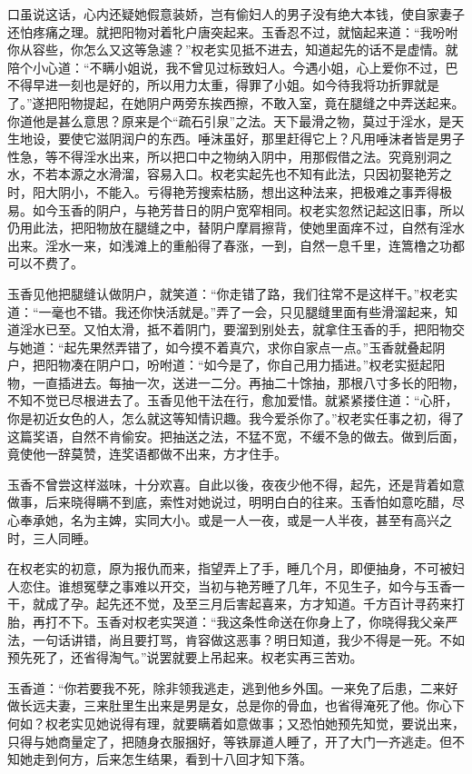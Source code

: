 \documentclass[a4paper,12pt,UTF8,twoside]{ctexbook}
\begin{document}
口虽说这话，心内还疑她假意装娇，岂有偷妇人的男子没有绝大本钱，使自家妻子还怕疼痛之理。就把阳物对着牝户唐突起来。玉香忍不过，就恼起来道：“我吩咐你从容些，你怎么又这等急遽？”权老实见抵不进去，知道起先的话不是虚情。就陪个小心道：“不瞒小姐说，我不曾见过标致妇人。今遇小姐，心上爱你不过，巴不得早进一刻也是好的，所以用力太重，得罪了小姐。如今待我将功折罪就是了。”遂把阳物提起，在她阴户两旁东挨西擦，不敢入室，竟在腿缝之中弄送起来。你道他是甚么意思？原来是个“疏石引泉”之法。天下最滑之物，莫过于淫水，是天生地设，要使它滋阴润户的东西。唾沫虽好，那里赶得它上？凡用唾沫者皆是男子性急，等不得淫水出来，所以把口中之物纳入阴中，用那假借之法。究竟别洞之水，不若本源之水滑溜，容易入口。权老实起先也不知有此法，只因初娶艳芳之时，阳大阴小，不能入。亏得艳芳搜索枯肠，想出这种法来，把极难之事弄得极易。如今玉香的阴户，与艳芳昔日的阴户宽窄相同。权老实忽然记起这旧事，所以仍用此法，把阳物放在腿缝之中，替阴户摩肩擦背，使她里面痒不过，自然有淫水出来。淫水一来，如浅滩上的重船得了春涨，一到，自然一息千里，连篙橹之功都可以不费了。

玉香见他把腿缝认做阴户，就笑道：“你走错了路，我们往常不是这样干。”权老实道：“一毫也不错。我还你快活就是。”弄了一会，只见腿缝里面有些滑溜起来，知道淫水已至。又怕太滑，抵不着阴门，要溜到别处去，就拿住玉香的手，把阳物交与她道：“起先果然弄错了，如今摸不着真穴，求你自家点一点。”玉香就叠起阴户，把阳物凑在阴户口，吩咐道：“如今是了，你自己用力插进。”权老实挺起阳物，一直插进去。每抽一次，送进一二分。再抽二十馀抽，那根八寸多长的阳物，不知不觉已尽根进去了。玉香见他干法在行，愈加爱惜。就紧紧搂住道：“心肝，你是初近女色的人，怎么就这等知情识趣。我今爱杀你了。”权老实任事之初，得了这篇奖语，自然不肯偷安。把抽送之法，不猛不宽，不缓不急的做去。做到后面，竟使他一辞莫赞，连奖语都做不出来，方才住手。

玉香不曾尝这样滋味，十分欢喜。自此以後，夜夜少他不得，起先，还是背着如意做事，后来晓得瞒不到底，索性对她说过，明明白白的往来。玉香怕如意吃醋，尽心奉承她，名为主婢，实同大小。或是一人一夜，或是一人半夜，甚至有高兴之时，三人同睡。

在权老实的初意，原为报仇而来，指望弄上了手，睡几个月，即便抽身，不可被妇人恋住。谁想冤孽之事难以开交，当初与艳芳睡了几年，不见生子，如今与玉香一干，就成了孕。起先还不觉，及至三月后害起喜来，方才知道。千方百计寻药来打胎，再打不下。玉香对权老实哭道：“我这条性命送在你身上了，你晓得我父亲严法，一句话讲错，尚且要打骂，肯容做这恶事？明日知道，我少不得是一死。不如预先死了，还省得淘气。”说罢就要上吊起来。权老实再三苦劝。

玉香道：“你若要我不死，除非领我逃走，逃到他乡外国。一来免了后患，二来好做长远夫妻，三来肚里生出来是男是女，总是你的骨血，也省得淹死了他。你心下何如？权老实见她说得有理，就要瞒着如意做事；又恐怕她预先知觉，要说出来，只得与她商量定了，把随身衣服捆好，等铁扉道人睡了，开了大门一齐逃走。但不知她走到何方，后来怎生结果，看到十八回才知下落。
\end{document}
